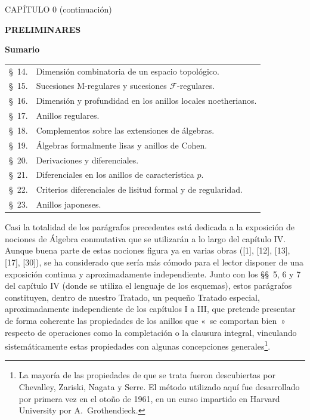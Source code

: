 \clearpage
\thispagestyle{plain}
\label{chapter:0IV1-es}

\begin{center}
{\large CAPÍTULO 0 (continuación)\footnotemark\par}
\vspace{1.5em}
{\Large\bfseries PRELIMINARES\par}
\vspace{2em}
{\large\bfseries Sumario\par}
\end{center}


\begin{center}
\begin{tabular}{@{}r l@{}}
\S~14. & Dimensión combinatoria de un espacio topológico.\\
\S~15. & Sucesiones M-regulares y sucesiones $\mathscr F$-regulares.\\
\S~16. & Dimensión y profundidad en los anillos locales noetherianos.\\
\S~17. & Anillos regulares.\\
\S~18. & Complementos sobre las extensiones de álgebras.\\
\S~19. & Álgebras formalmente lisas y anillos de Cohen.\\
\S~20. & Derivaciones y diferenciales.\\
\S~21. & Diferenciales en los anillos de característica $p$.\\
\S~22. & Criterios diferenciales de lisitud formal y de regularidad.\\
\S~23. & Anillos japoneses.
\end{tabular}
\end{center}

Casi la totalidad de los parágrafos precedentes está dedicada a la exposición
de nociones de Álgebra conmutativa que se utilizarán a lo largo del capítulo
IV. Aunque buena parte de estas nociones figura ya en varias obras ([1], [12],
[13], [17], [30]), se ha considerado que sería más cómodo para el lector
disponer de una exposición continua y aproximadamente independiente. Junto con
los \S\S~5, 6 y 7 del capítulo IV (donde se utiliza el lenguaje de los
esquemas), estos parágrafos constituyen, dentro de nuestro Tratado, un pequeño
Tratado especial, aproximadamente independiente de los capítulos I a III, que
pretende presentar de forma coherente las propiedades de los anillos que «~se
comportan bien~» respecto de operaciones como la completación o la clausura
integral, vinculando sistemáticamente estas propiedades con algunas
concepciones generales\footnote{La mayoría de las propiedades de que se trata
fueron descubiertas por Chevalley, Zariski, Nagata y Serre. El método utilizado
aquí fue desarrollado por primera vez en el otoño de 1961, en un curso impartido
en Harvard University por A.~Grothendieck.}.

